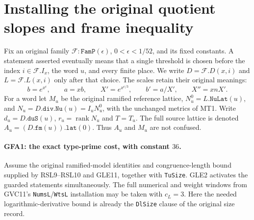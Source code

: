 \section{Installing the original quotient slopes and frame inequality}
\label{sec:global-assembly-v034}


Fix an original family $\mathcal F:\texttt{FamP}(\epsilon)$,
$0<\epsilon<1/52$, and its fixed constants.  A statement asserted
eventually means that a single threshold is chosen before the index
$i\in\mathcal F.I_x$, the word $u$, and every finite place.  We write
$D=\mathcal F.D(x,i)$ and $L=\mathcal F.L(x,i)$ only after that choice.
The scales retain their original meanings:
\[
 b=e^{x^\epsilon},\qquad a=xb,\qquad
 X'=e^{x^{\epsilon/3}},\qquad b'=a/X',\qquad
 X''=xnX'.                                                    \tag{GFA.1}
\]
For a word let $M_u$ be the original ramified reference lattice,
$N_u^0=L.\texttt{NuLat}(u)$, and
$N_u=D.\texttt{div.Nu}(u)=I_uN_u^0$, with the unchanged metrics of MT1.
Write $d_u=D.\texttt{duS}(u)$, $r_u=\operatorname{rank}N_u$ and
$T=T_u$.  The full source lattice is denoted $A_u=(D.\texttt{fm}(u)).
\texttt{lat}(0)$.  Thus $A_u$ and $M_u$ are not confused.

\paragraph{GFA1: the exact type-prime cost, with constant $36$.}
\label{claim:GFA1}
Assume the original ramified-model identities and congruence-length
bound supplied by RSL9--RSL10 and GLE11, together with
\texttt{TuSize}.  GLE2 activates the guarded statements simultaneously.
The full numerical and weight windows from GVC11's
\texttt{NumsL}/\texttt{WtsL} installation may be taken with $c_L=3$.
Here the needed logarithmic-derivative bound is already the
\texttt{DlSize} clause of the original size record.

